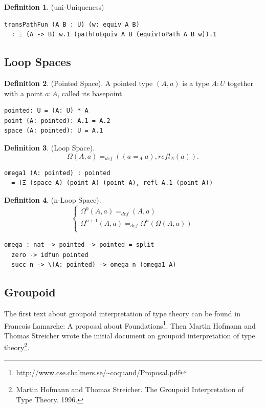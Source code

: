 \documentclass{article}
\theoremstyle{definition}
\newtheorem{definition}{Definition}
\begin{document}
\begin{definition} (uni-Uniqueness)
\begin{lstlisting}
transPathFun (A B : U) (w: equiv A B)
  : Ξ (A -> B) w.1 (pathToEquiv A B (equivToPath A B w)).1
\end{lstlisting}
\end{definition}

\newpage
\subsection{Loop Spaces}

\begin{definition} (Pointed Space). A pointed type $(A,a)$ is a type $A:U$
together with a point $a:A$, called its basepoint.
\begin{lstlisting}
pointed: U = (A: U) * A
point (A: pointed): A.1 = A.2
space (A: pointed): U = A.1
\end{lstlisting}
\end{definition}

\begin{definition} (Loop Space).
$$\Omega(A,a) =_{def} ((a =_A a), refl_A(a)).$$
\begin{lstlisting}
omega1 (A: pointed) : pointed
  = (Ξ (space A) (point A) (point A), refl A.1 (point A))
\end{lstlisting}
\end{definition}

\begin{definition} (n-Loop Space).
$$
\begin{cases}
\Omega^0(A, a) =_{def} (A, a)\\
\Omega^{n+1}(A,a) =_{def} \Omega^{n}(\Omega(A,a))\\
\end{cases}
$$
\begin{lstlisting}
omega : nat -> pointed -> pointed = split
  zero -> idfun pointed
  succ n -> \(A: pointed) -> omega n (omega1 A)
\end{lstlisting}
\end{definition}

\newpage
\subsection{Groupoid}
The first text about groupoid interpretation of type theory can be found in Francois Lamarche:
A proposal about Foundations\footnote{\url{http://www.cse.chalmers.se/~coquand/Proposal.pdf}}.
Then Martin Hofmann and Thomas Streicher wrote the initial
document on groupoid interpretation of type
theory\footnote{Martin Hofmann and Thomas Streicher. The Groupoid Interpretation of Type Theory. 1996.}.
\end{document}
